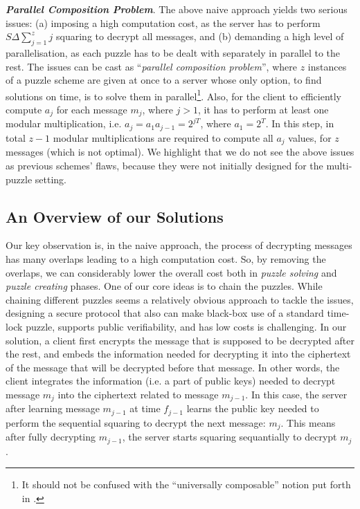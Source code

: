 \noindent\textit{\textbf{Parallel Composition Problem}}. The above naive approach yields two serious issues: (a) imposing a high computation cost, as  the server has to perform $S\Delta \sum\limits_{\scriptscriptstyle j=1}^{\scriptscriptstyle z}j$ squaring to decrypt all   messages, and (b) demanding a high level of parallelisation, as each puzzle has to be dealt with separately in parallel to the rest.  The  issues can be cast  as  ``\emph{parallel composition problem}'', where $z$ instances of a puzzle scheme are given at once to a server whose only option, to find solutions on time, is to solve them in parallel\footnote{It should not be confused with the ``universally composable'' notion put forth in \cite{Canetti01}.}. Also, for the client  to efficiently compute $a_{\scriptscriptstyle j}$  for each  message $m_{\scriptscriptstyle j}$,  where $j>1$, it has to perform at least one modular multiplication, i.e. $a_{\scriptscriptstyle j}=a_{\scriptscriptstyle 1} a_{\scriptscriptstyle j-1}=2^{\scriptscriptstyle j  T}$, where $a_{\scriptscriptstyle 1}=2^{\scriptscriptstyle T}$. In this step, in total $z-1$ modular multiplications are required  to compute all $a_{\scriptscriptstyle j}$ values, for $z$ messages (which is not optimal). We highlight that we do not see the above issues as  previous schemes' flaws, because they were not initially designed for the multi-puzzle setting.  
 


%

 \subsection{An Overview of our Solutions}\label{Overview-of-our-Solutions}
 Our key observation is, in the naive approach, the process of decrypting  messages has many overlaps  leading to a high  computation cost. So,  by removing the overlaps, we can considerably lower the overall cost both in \emph{puzzle solving} and \emph{puzzle creating} phases.  One of our core ideas  is to chain the puzzles. While chaining different puzzles seems a relatively obvious approach to tackle the  issues, designing a secure protocol that also can make black-box use of a standard time-lock puzzle, supports public verifiability, and has low costs is challenging. In our solution, a client  first encrypts the message  that is supposed to be decrypted after the rest, and embeds the information needed for decrypting it into the ciphertext of the message that will be decrypted before that message. In other words, the client integrates the information (i.e. a part of public keys) needed to decrypt message $m_{\scriptscriptstyle j}$ into the ciphertext related to message $m_{\scriptscriptstyle j-1}$. In this case, the server after learning message $m_{\scriptscriptstyle j-1}$ at time $f_{\scriptscriptstyle j-1}$ learns the public key needed to perform the sequential squaring to decrypt the next message: $m_{\scriptscriptstyle j}$. This means after fully decrypting $m_{\scriptscriptstyle j-1}$, the server starts  squaring sequantially to decrypt $m_{\scriptscriptstyle j}$. 
  
